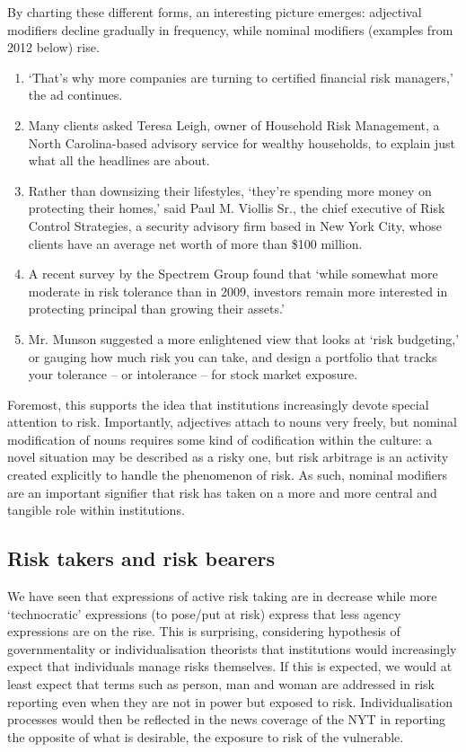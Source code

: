 By charting these different forms, an interesting picture emerges: adjectival modifiers decline gradually in frequency, while nominal modifiers (examples from 2012 below) rise. 

\begin{enumerate} [before=\color{black}\ttfamily] \setlength\itemsep{0em} \small
\item `That's why more companies are turning to certified financial risk managers,' the ad continues.
\item Many clients asked Teresa Leigh, owner of Household Risk Management, a North Carolina-based advisory service for wealthy households, to explain just what all the headlines are about.
\item Rather than downsizing their lifestyles, `they're spending more money on protecting their homes,' said Paul M. Viollis Sr., the chief executive of Risk Control Strategies, a security advisory firm based in New York City, whose clients have an average net worth of more than \$100 million.
\item A recent survey by the Spectrem Group found that `while somewhat more moderate in risk tolerance than in 2009, investors remain more interested in protecting principal than growing their assets.'
\item Mr. Munson suggested a more enlightened view that looks at `risk budgeting,' or gauging how much risk you can take, and design a portfolio that tracks your tolerance -- or intolerance -- for stock market exposure.
\end{enumerate}


Foremost, this supports the idea that institutions increasingly devote special attention to risk. Importantly, adjectives attach to nouns very freely, but nominal modification of nouns requires some kind of codification within the culture: a novel situation may be described as a risky one, but risk arbitrage is an activity created explicitly to handle the phenomenon of risk. As such, nominal modifiers are an important signifier that risk has taken on a more and more central and tangible role within institutions.

\subsection{Risk takers and risk bearers}

We have seen that expressions of active risk taking are in decrease while more `technocratic' expressions (to pose\slash put at risk) express that less agency expressions are on the rise. This is surprising, considering hypothesis of governmentality or individualisation theorists that institutions would increasingly expect that individuals manage risks themselves. If this is expected, we would at least expect that terms such as person, man and woman are addressed in risk reporting even when they are not in power but exposed to risk. Individualisation processes would then be reflected in the news coverage of the NYT in reporting the opposite of what is desirable, the exposure to risk of the vulnerable.

